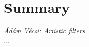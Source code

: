 \documentclass[a4paper,12pt]{article}
\begin{document}
\pagestyle{empty}

\section*{Summary}

\textit{Ádám Vécsi: Artistic filters}

\bigskip

$\ldots$
\end{document}
